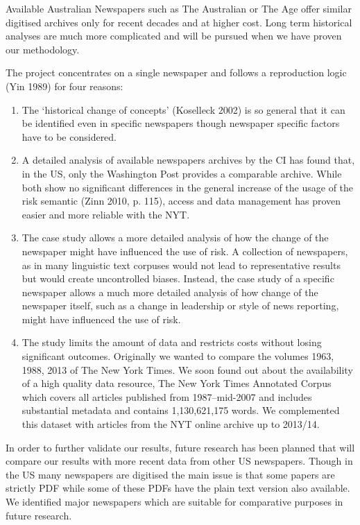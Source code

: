 Available Australian Newspapers such as The Australian or The Age offer similar digitised archives only for recent decades and at higher cost. Long term historical analyses are much more complicated and will be pursued when we have proven our methodology.

The project concentrates on a single newspaper and follows a reproduction logic (Yin 1989) for four reasons:

\begin{enumerate}
\item The `historical change of concepts' (Koselleck 2002) is so general that it can be identified even in specific newspapers though newspaper specific factors have to be considered.
\item A detailed analysis of available newspapers archives by the CI has found that, in the US, only the Washington Post provides a comparable archive. While both show no significant differences in the general increase of the usage of the risk semantic (Zinn 2010, p. 115), access and data management has proven easier and more reliable with the NYT.
\item The case study allows a more detailed analysis of how the change of the newspaper might have influenced the use of risk. A collection of newspapers, as in many linguistic text corpuses would not lead to representative results but would create uncontrolled biases. Instead, the case study of a specific newspaper allows a much more detailed analysis of how change of the newspaper itself, such as a change in leadership or style of news reporting, might have influenced the use of risk.
\item The study limits the amount of data and restricts costs without losing significant outcomes. Originally we wanted to compare the volumes 1963, 1988, 2013 of The New York Times. We soon found out about the availability of a high quality data resource, The New York Times Annotated Corpus  which covers all articles published from 1987--mid-2007 and includes substantial metadata and contains 1,130,621,175 words. We complemented this dataset with articles from the NYT online archive up to 2013\slash 14.
\end{enumerate} 

In order to further validate our results, future research has been planned that will compare our results with more recent data from other US newspapers. Though in the US many newspapers are digitised the main issue is that some papers are strictly PDF while some of these PDFs have the plain text version also available. We identified major newspapers which are suitable for comparative purposes in future research.

